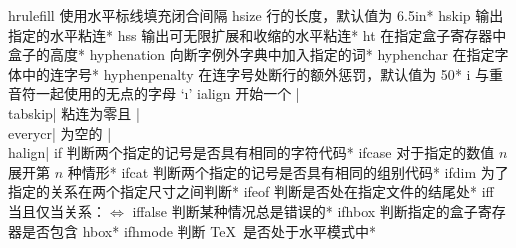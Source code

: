 \capcs hrulefill {使用水平标线填充闭合间隔}{}{}
\capcs hsize {行的长度，默认值为 6.5\thinspace in}*{}
\capcs hskip {输出指定的水平粘连}*{}
\capcs hss {输出可无限扩展和收缩的水平粘连}*{}
\capcs ht {在指定盒子寄存器中盒子的高度}*{}
\capcs hyphenation {向断字例外字典中加入指定的词}*{}
\capcs hyphenchar {在指定字体中的连字号}*{}
\capcs hyphenpenalty {在连字号处断行的额外惩罚，默认值为 50}*{}
\capcs i {与重音符一起使用的无点的字母 `\i'}{}{}
\capcs ialign {开始一个 |\\tabskip| 粘连为零且 |\\everycr| 为空的 |\\halign|}{}{}
\capcs if {判断两个指定的记号是否具有相同的字符代码}*{\@if}
\capcs ifcase {对于指定的数值 $n$ 展开第 $n$ 种情形}*{\@ifcase}
\capcs ifcat {判断两个指定的记号是否具有相同的组别代码}*{\@ifcat}
\capcs ifdim {为了指定的关系在两个指定尺寸之间判断}*{\@ifdim}
\capcs ifeof {判断是否处在指定文件的结尾处}*{\@ifeof}
\capcs iff {当且仅当关系：$\iff$}{}{}
\capcs iffalse {判断某种情况总是错误的}*{\@iffalse}
\capcs ifhbox {判断指定的盒子寄存器是否包含 hbox}*{\@ifhbox}
\capcs ifhmode {判断 \TeX\ 是否处于水平模式中}*{\@ifhmode}
